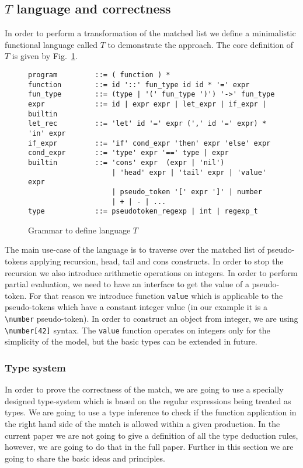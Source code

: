 
\subsection{$T$ language and correctness}
In order to perform a transformation of the matched list we define a
minimalistic functional language called $T$ to demonstrate
the approach.  The core definition of $T$ is given by Fig.~\ref{fig:t}.

\begin{figure}
\begin{verbatim}
program         ::= ( function ) *
function        ::= id '::' fun_type id id * '=' expr
fun_type        ::= (type | '(' fun_type ')') '->' fun_type
expr            ::= id | expr expr | let_expr | if_expr | builtin
let_rec         ::= 'let' id '=' expr (',' id '=' expr) * 'in' expr
if_expr         ::= 'if' cond_expr 'then' expr 'else' expr
cond_expr       ::= 'type' expr '==' type | expr
builtin         ::= 'cons' expr  (expr | 'nil') 
                    | 'head' expr | 'tail' expr | 'value' expr
                    | pseudo_token '[' expr ']' | number
                    | + | - | ...
type            ::= pseudotoken_regexp | int | regexp_t
\end{verbatim}
\caption{\label{fig:t}Grammar to define language $T$}
\end{figure}

The main use-case of the language is to traverse over the matched
list of pseudo-tokens applying recursion, head, tail and cons
constructs.  In order to stop the recursion we also introduce
arithmetic operations on integers.  In order to perform partial
evaluation, we need to have an interface to get the value of a
pseudo-token.  For that reason we introduce function \verb|value|
which is applicable to the pseudo-tokens which have a constant
integer value (in our example it is a \verb|\number| pseudo-token).
In order to construct an object from integer, we are using
\verb|\number[42]| syntax.  The \verb|value| function operates
on integers only for the simplicity of the model, but the basic
types can be extended in future.

\subsubsection{Type system}
In order to prove the correctness of the match, we are going to use
a specially designed type-system which is based on the regular 
expressions being treated as types.  We are going to use a type
inference to check if the function application in the right hand
side of the match is allowed within a given production.  In the
current paper we are not going to give a definition of all the
type deduction rules, however, we are going to do that in the 
full paper.  Further in this section we are going to share the
basic ideas and principles.

